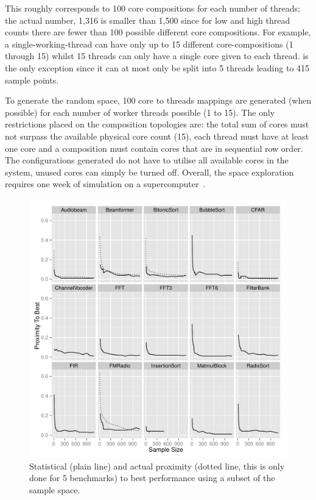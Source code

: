 This roughly corresponds to 100 core compositions for each number of threads; the actual number, 1,316 is smaller than 1,500 since for low and high thread counts there are fewer than 100 possible different core compositions.
For example, a single-working-thread can have only up to 15 different core-compositions (1 through 15) whilst 15 threads can only have a single core given to each thread.
 is the only exception since it can at most only be split into 5 threads leading to 415 sample points.

To generate the random space, 100 core to threads mappings are generated (when possible) for each number of worker threads possible (1 to 15).
The only restrictions placed on the composition topologies are: the total sum of cores must not surpass the available physical core count (15), each thread must have at least one core and a composition must contain cores that are in sequential row order.
The configurations generated do not have to utilise all available cores in the system, unused cores can simply be turned off.
Overall, the space exploration requires one week of simulation on a supercomputer~\cite{ecdf}.

\begin{figure}[t]
  \centering
    \includegraphics[width=1\textwidth]{streamit-paper/graphics/ESCProx.pdf}
    \caption{Statistical (plain line) and actual proximity (dotted line, this is only done for 5 benchmarks) to best performance using a subset of the sample space.}\label{fig:prox}
\end{figure}

